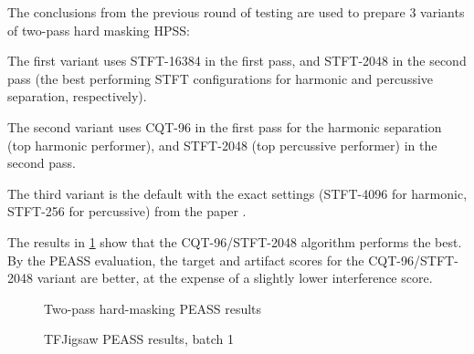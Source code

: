 \documentclass[letter,12pt]{article}
\newenvironment{tight_enumerate}{
\begin{enumerate}
  \setlength{\itemsep}{0pt}
  \setlength{\parskip}{0pt}
}{\end{enumerate}}
\begin{document}
The conclusions from the previous round of testing are used to prepare 3 variants of two-pass hard masking HPSS:
\begin{tight_enumerate}
	\item
		The first variant uses STFT-16384 in the first pass, and STFT-2048 in the second pass (the best performing STFT configurations for harmonic and percussive separation, respectively).
	\item
		The second variant uses CQT-96 in the first pass for the harmonic separation (top harmonic performer), and STFT-2048 (top percussive performer) in the second pass.
	\item
		The third variant is the default with the exact settings (STFT-4096 for harmonic, STFT-256 for percussive) from the paper \cite{driedger}.
\end{tight_enumerate}

The results in \ref{fig:round2hard} show that the CQT-96/STFT-2048 algorithm performs the best. By the PEASS evaluation, the target and artifact scores for the CQT-96/STFT-2048 variant are better, at the expense of a slightly lower interference score.

\begin{figure}
	\centering
	\vspace{-1.25em}
	\caption{Two-pass hard-masking PEASS results}
	\label{fig:round2hard}
\end{figure}

\begin{figure}
	\centering
	\vspace{-1.25em}
	\caption{TFJigsaw PEASS results, batch 1}
	\label{fig:jigsaw1}
\end{figure}
\end{document}
